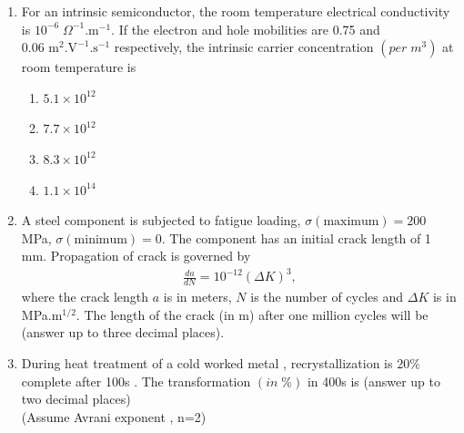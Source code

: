 \documentclass[journal]{IEEEtran}
\theoremstyle{remark}
\begin{document}
\begin{enumerate}
\item For an intrinsic semiconductor, the room temperature electrical conductivity is $10^{-6} \; \Omega^{-1}\text{.m}^{-1}$. If the electron and hole mobilities are 0.75 and $0.06 \text{ m}^2\text{.V}^{-1}\text{.s}^{-1}$ respectively, the intrinsic carrier concentration $(per\; m^3)$ at room temperature is \hfill{}
\begin{multicols}{4}
\begin{enumerate}
    \item $5.1 \times 10^{12}$
    \item $7.7 \times 10^{12}$
    \item $8.3 \times 10^{12}$
    \item $1.1 \times 10^{14}$
\end{enumerate}
\end{multicols}

\item A steel component is subjected to fatigue loading, $\sigma(\text{maximum}) = 200$ MPa, $\sigma(\text{minimum}) = 0$. The component has an initial crack length of 1 mm. Propagation of crack is governed by 
\begin{align}
\frac{da}{dN}=10^{-12}(\Delta K)^3,
\end{align}
where the crack length $a$ is in meters, $N$ is the number of cycles and $\Delta K$ is in MPa.m$^{1/2}$. The length of the crack (in m) after one million cycles will be \underline {\hspace{2cm}}(answer up to three decimal places). \hfill{}

\item During heat treatment of a cold worked metal , recrystallization is $20\%$ complete after 100s . The  transformation $(in\;\%)$ in 400s is \underline {\hspace{2cm}} (answer up to two decimal places)\\
(Assume Avrani exponent , n=2)
\hfill{}



\end{enumerate}
\end{document}
